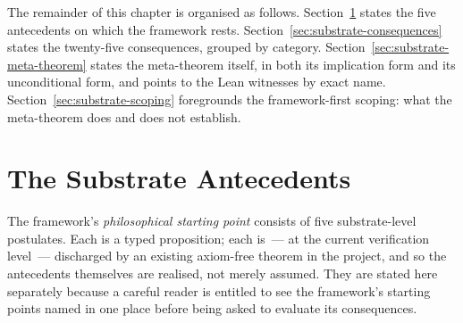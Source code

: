 The remainder of this chapter is organised as follows.
Section~\ref{sec:substrate-antecedents} states the five
antecedents on which the framework rests. Section~\ref{sec:substrate-consequences}
states the twenty-five consequences, grouped by category.
Section~\ref{sec:substrate-meta-theorem} states the meta-theorem
itself, in both its implication form and its unconditional form,
and points to the Lean witnesses by exact name.
Section~\ref{sec:substrate-scoping} foregrounds the
framework-first scoping: what the meta-theorem does and does not
establish.

\section{The Substrate Antecedents}
\label{sec:substrate-antecedents}

The framework's \emph{philosophical starting point} consists of
five substrate-level postulates. Each is a typed proposition; each
is~--- at the current verification level~--- discharged by an
existing axiom-free theorem in the project, and so the antecedents
themselves are realised, not merely assumed. They are stated here
separately because a careful reader is entitled to see the
framework's starting points named in one place before being asked
to evaluate its consequences.


